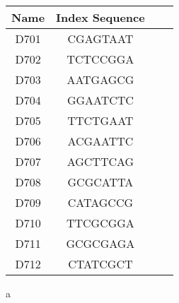 \begin{center}
\begin{threeparttable}
\begin{tabular}{cccc}\toprule
\textbf{Name} & \textbf{Index Sequence}\tnote{a}\\\midrule
D701 & CGAGTAAT\\
D702 & TCTCCGGA\\
D703 & AATGAGCG\\
D704 & GGAATCTC\\
D705 & TTCTGAAT\\
D706 & ACGAATTC\\
D707 & AGCTTCAG\\
D708 & GCGCATTA\\
D709 & CATAGCCG\\
D710 & TTCGCGGA\\
D711 & GCGCGAGA\\
D712 & CTATCGCT\\
\bottomrule
\end{tabular}
\begin{tablenotes}
\item[a] \parencite{illumina2018adaptors}
\end{tablenotes}
\end{threeparttable}
\end{center}

